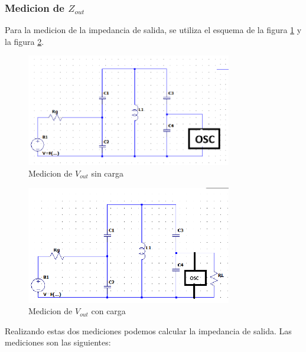 \subsubsection{Medicion de $Z_{out}$}

Para la medicion de la impedancia de salida, se utiliza el esquema de la figura \ref{fig: Primer esquema de la medicion de la impedancia de salida} y la figura
\ref{fig: Segundo esquema de la medicion de la impedancia de salida}.

%
\begin{figure}[h]
    \centering
    \includegraphics[width=0.8\textwidth]{Imagenes/medicion_zout1.png}
    \caption{Medicion de $V_{out}$ sin carga}
    \label{fig: Primer esquema de la medicion de la impedancia de salida}
\end{figure}

% 
\begin{figure}[h]
    \centering
    \includegraphics[width=0.8\textwidth]{Imagenes/medicion_zout2.png}
    \caption{Medicion de $V_{out}$ con carga}
    \label{fig: Segundo esquema de la medicion de la impedancia de salida}
\end{figure}




Realizando estas dos mediciones podemos calcular la impedancia de salida. Las mediciones son las siguientes:

